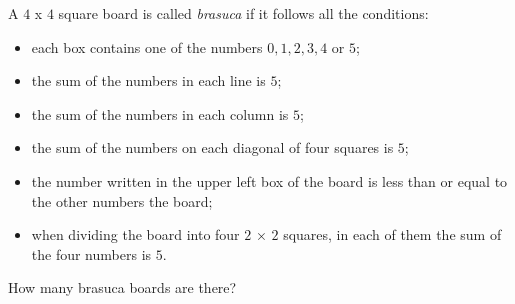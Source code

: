 A $4$ x $4$ square board is called \emph{brasuca} if it follows all the conditions:
\begin{itemize}
\item each box contains one of the numbers $0, 1, 2, 3, 4$ or $5$;
\item the sum of the numbers in each line is $5$;
\item the sum of the numbers in each column is $5$;
\item the sum of the numbers on each diagonal of four squares is $5$;
\item the number written in the upper left box of the board is less than or equal to the other numbers
the board;
\item when dividing the board into four $2$ × $2$ squares, in each of them the sum of the four
numbers is $5$.
\end{itemize}

How many brasuca boards are there?

